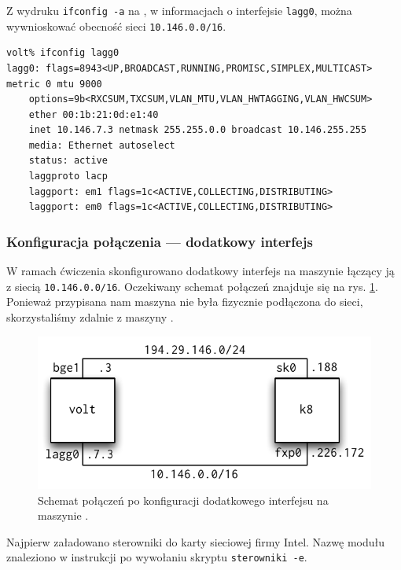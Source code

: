 Z wydruku \texttt{ifconfig -a} na \volt{}, w informacjach o interfejsie
\texttt{lagg0}, można wywnioskować obecność sieci \texttt{10.146.0.0/16}.

\begin{lstlisting}
volt% ifconfig lagg0
lagg0: flags=8943<UP,BROADCAST,RUNNING,PROMISC,SIMPLEX,MULTICAST> metric 0 mtu 9000
    options=9b<RXCSUM,TXCSUM,VLAN_MTU,VLAN_HWTAGGING,VLAN_HWCSUM>
    ether 00:1b:21:0d:e1:40
    inet 10.146.7.3 netmask 255.255.0.0 broadcast 10.146.255.255
    media: Ethernet autoselect
    status: active
    laggproto lacp
    laggport: em1 flags=1c<ACTIVE,COLLECTING,DISTRIBUTING>
    laggport: em0 flags=1c<ACTIVE,COLLECTING,DISTRIBUTING>
\end{lstlisting}

\subsubsection{Konfiguracja połączenia --- dodatkowy interfejs}
\label{sec:eth:konfiguracja}

W ramach ćwiczenia skonfigurowano dodatkowy interfejs na maszynie \kosiem{}
łączący ją z siecią \texttt{10.146.0.0/16}. Oczekiwany schemat połączeń znajduje
się na rys. \ref{fig:eth:schemat-po-konfiguracji}. Ponieważ przypisana nam
maszyna \kdziew{} nie była fizycznie podłączona do sieci, skorzystaliśmy zdalnie
z maszyny \kosiem.

\begin{figure}[h!]
  \centering
  \includegraphics{figury/ethernet/schemat-po-konfiguracji.pdf}
  \caption{Schemat połączeń \eth{} po konfiguracji dodatkowego interfejsu na maszynie \kosiem.}
  \label{fig:eth:schemat-po-konfiguracji}
\end{figure}

Najpierw załadowano sterowniki do karty sieciowej firmy Intel. Nazwę modułu
znaleziono w instrukcji po wywołaniu skryptu \texttt{sterowniki -e}.

